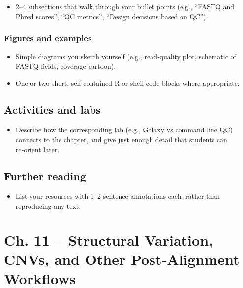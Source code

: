 \documentclass[
  letterpaper,
  DIV=11,
  numbers=noendperiod]{scrreprt}
\providecommand{\tightlist}{%
  \setlength{\itemsep}{0pt}\setlength{\parskip}{0pt}}
\begin{document}
\begin{itemize}
\tightlist
\item
  2--4 subsections that walk through your bullet points (e.g., ``FASTQ
  and Phred scores'', ``QC metrics'', ``Design decisions based on QC'').
\end{itemize}

\subsection{Figures and examples}\label{figures-and-examples-6}

\begin{itemize}
\tightlist
\item
  Simple diagrams you sketch yourself (e.g., read‑quality plot,
  schematic of FASTQ fields, coverage cartoon).
\item
  One or two short, self‑contained R or shell code blocks where
  appropriate.
\end{itemize}

\section{Activities and labs}\label{activities-and-labs-6}

\begin{itemize}
\tightlist
\item
  Describe how the corresponding lab (e.g., Galaxy vs command line QC)
  connects to the chapter, and give just enough detail that students can
  re‑orient later.
\end{itemize}

\section{Further reading}\label{further-reading-6}

\begin{itemize}
\tightlist
\item
  List your resources with 1--2‑sentence annotations each, rather than
  reproducing any text.
\end{itemize}


\chapter{Ch. 11 -- Structural Variation, CNVs, and Other Post‑Alignment
Workflows}\label{ch.-11-structural-variation-cnvs-and-other-postalignment-workflows}
\end{document}

